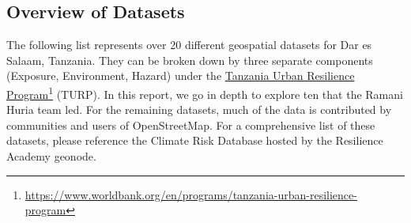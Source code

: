 \documentclass[a4paper,12pt,twoside]{article}
\begin{document}
\subsection{Overview of Datasets}
The following  list represents over 20 different geospatial datasets for Dar es Salaam, Tanzania. They can be broken down by three separate components (Exposure, Environment, Hazard) under the \href{https://www.worldbank.org/en/programs/tanzania-urban-resilience-program}{Tanzania Urban Resilience Program}\footnote{\url{https://www.worldbank.org/en/programs/tanzania-urban-resilience-program}} (TURP). In this report, we go in depth to explore ten that the Ramani Huria team led. For the remaining datasets, much of the data is contributed by communities and users of OpenStreetMap. 
For a comprehensive list of these datasets, please reference the Climate Risk Database hosted by the Resilience Academy geonode.
\end{document}
